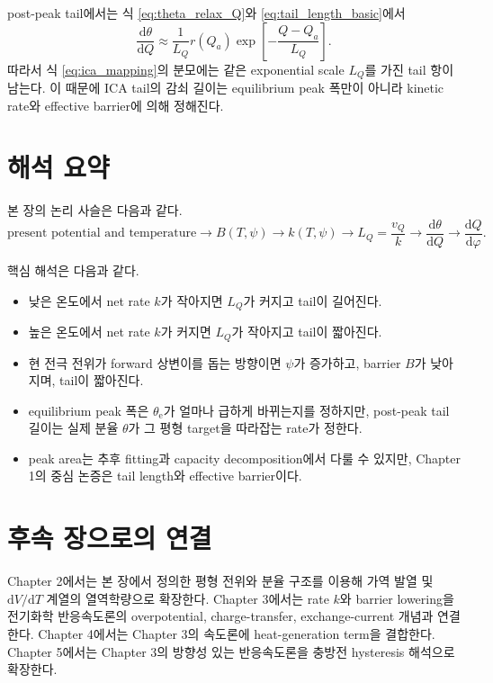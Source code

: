 \documentclass[11pt]{article}
\newcommand{\dd}{\mathrm{d}}
\begin{document}
post-peak tail에서는 식 \eqref{eq:theta_relax_Q}와 \eqref{eq:tail_length_basic}에서
\begin{equation}
\frac{\dd\theta}{\dd Q}
\approx
\frac{1}{L_Q}
r(Q_a)
\exp\!\left[-\frac{Q-Q_a}{L_Q}\right].
\label{eq:dtheta_tail}
\end{equation}
따라서 식 \eqref{eq:ica_mapping}의 분모에는 같은 exponential scale \(L_Q\)를 가진 tail 항이 남는다. 이 때문에 ICA tail의 감쇠 길이는 equilibrium peak 폭만이 아니라 kinetic rate와 effective barrier에 의해 정해진다.

\section{해석 요약}

본 장의 논리 사슬은 다음과 같다.
\[
\text{present potential and temperature}
\rightarrow
B(T,\psi)
\rightarrow
k(T,\psi)
\rightarrow
L_Q=\frac{v_Q}{k}
\rightarrow
\frac{\dd\theta}{\dd Q}
\rightarrow
\frac{\dd Q}{\dd\varphi}.
\]

핵심 해석은 다음과 같다.

\begin{itemize}
\item 낮은 온도에서 net rate \(k\)가 작아지면 \(L_Q\)가 커지고 tail이 길어진다.
\item 높은 온도에서 net rate \(k\)가 커지면 \(L_Q\)가 작아지고 tail이 짧아진다.
\item 현 전극 전위가 forward 상변이를 돕는 방향이면 \(\psi\)가 증가하고, barrier \(B\)가 낮아지며, tail이 짧아진다.
\item equilibrium peak 폭은 \(\theta_{\mathrm e}\)가 얼마나 급하게 바뀌는지를 정하지만, post-peak tail 길이는 실제 분율 \(\theta\)가 그 평형 target을 따라잡는 rate가 정한다.
\item peak area는 추후 fitting과 capacity decomposition에서 다룰 수 있지만, Chapter 1의 중심 논증은 tail length와 effective barrier이다.
\end{itemize}

\section{후속 장으로의 연결}

Chapter 2에서는 본 장에서 정의한 평형 전위와 분율 구조를 이용해 가역 발열 및 \(\dd V/\dd T\) 계열의 열역학량으로 확장한다. Chapter 3에서는 rate \(k\)와 barrier lowering을 전기화학 반응속도론의 overpotential, charge-transfer, exchange-current 개념과 연결한다. Chapter 4에서는 Chapter 3의 속도론에 heat-generation term을 결합한다. Chapter 5에서는 Chapter 3의 방향성 있는 반응속도론을 충방전 hysteresis 해석으로 확장한다.
\end{document}
